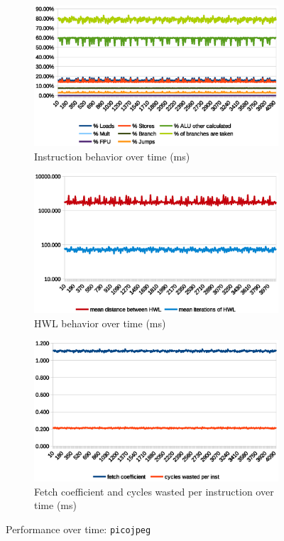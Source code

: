 \documentclass[../bachelor_paper.tex]{subfiles}
\begin{document}
\begin{figure}
    \begin{subfigure}{0.45\textwidth}
        \includegraphics[width=\textwidth]{img/graph/embench/picojpeg_inst.eps}
        \caption{Instruction behavior over time (ms)}
    \end{subfigure}
    \begin{subfigure}{0.45\textwidth}
        \includegraphics[width=\textwidth]{img/graph/embench/picojpeg_hwl.eps}
        \caption{\ac{HWL} behavior over time (ms)}
    \end{subfigure}
    \begin{subfigure}{0.45\textwidth}
        \includegraphics[width=\textwidth]{img/graph/embench/picojpeg_fetch_waste.eps}
        \caption{Fetch coefficient and cycles wasted per instruction over time (ms)}
    \end{subfigure}
    \caption{Performance over time: \texttt{picojpeg}}
\end{figure}
\end{document}
